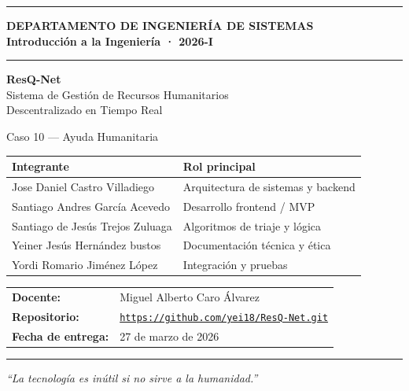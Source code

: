 \documentclass[12pt,a4paper]{article}
\begin{document}
\begin{titlepage}
  \centering
  \vspace*{1cm}

  {\color{primary}\rule{\linewidth}{2pt}}
  \vspace{0.5cm}

  {\LARGE\bfseries\color{primary}
    DEPARTAMENTO DE INGENIERÍA DE SISTEMAS\\[0.3cm]
    Introducción a la Ingeniería · 2026-I}

  \vspace{0.5cm}
  {\color{accent}\rule{\linewidth}{1pt}}
  \vspace{1.5cm}

  {\Huge\bfseries\color{primary} ResQ-Net}\\[0.4cm]
  {\Large Sistema de Gestión de Recursos Humanitarios\\
  Descentralizado en Tiempo Real}

  \vspace{1cm}
  {\large\color{gray} Caso 10 --- Ayuda Humanitaria}

  \vspace{2cm}
  \begin{tabular}{ll}
    \toprule
    \textbf{Integrante} & \textbf{Rol principal} \\
    \midrule
    Jose Daniel Castro Villadiego & Arquitectura de sistemas y backend \\
    Santiago Andres García Acevedo & Desarrollo frontend / MVP \\
    Santiago de Jesús Trejos Zuluaga & Algoritmos de triaje y lógica \\
    Yeiner Jesús Hernández bustos & Documentación técnica y ética \\
    Yordi Romario Jiménez López & Integración y pruebas \\
    \bottomrule
  \end{tabular}

  \vspace{1.5cm}
  \begin{tabular}{ll}
    \textbf{Docente:} & Miguel Alberto Caro Álvarez \\
    \textbf{Repositorio:} & \href{https://github.com/yei18/ResQ-Net.git}{\texttt{https://github.com/yei18/ResQ-Net.git}} \\
    \textbf{Fecha de entrega:} & 27 de marzo de 2026 \\
  \end{tabular}

  \vfill
  {\color{primary}\rule{\linewidth}{2pt}}

  \vspace{0.4cm}
  {\small\itshape ``La tecnología es inútil si no sirve a la humanidad.''}
\end{titlepage}
\end{document}
